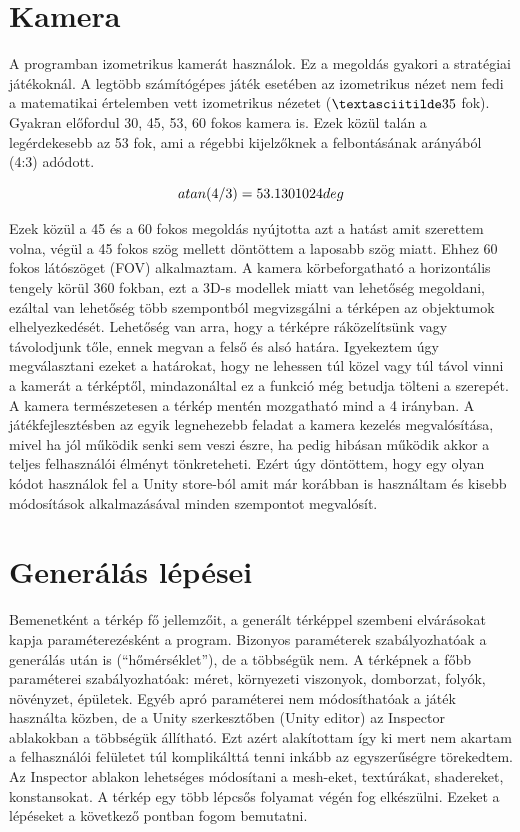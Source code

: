 \section{Kamera}

A programban izometrikus kamerát használok. Ez a megoldás gyakori a stratégiai játékoknál. A legtöbb számítógépes játék esetében az izometrikus nézet nem fedi a matematikai értelemben vett izometrikus nézetet ($\textasciitilde 35$ fok). Gyakran előfordul 30, 45, 53, 60 fokos kamera is. Ezek közül talán a legérdekesebb az 53 fok, ami a régebbi kijelzőknek a felbontásának arányából (4:3) adódott. 

$$
atan(4 / 3) = 53.1301024 \space deg
$$

\noindent Ezek közül a 45 és a 60 fokos megoldás nyújtotta azt a hatást amit szerettem volna, végül a 45 fokos szög mellett döntöttem a laposabb szög miatt. Ehhez 60 fokos látószöget (FOV) alkalmaztam. A kamera körbeforgatható a horizontális tengely körül 360 fokban, ezt a 3D-s modellek miatt van lehetőség megoldani, ezáltal van lehetőség több szempontból megvizsgálni a térképen az objektumok elhelyezkedését. Lehetőség van arra, hogy a térképre ráközelítsünk vagy távolodjunk tőle, ennek megvan a felső és alsó határa. Igyekeztem úgy megválasztani ezeket a határokat, hogy ne lehessen túl közel vagy túl távol vinni a kamerát a térképtől, mindazonáltal ez a funkció még betudja tölteni a szerepét. A kamera természetesen a térkép mentén mozgatható mind a 4 irányban. 
\newline
\newline A játékfejlesztésben az egyik legnehezebb feladat a kamera kezelés megvalósítása, mivel ha jól működik senki sem veszi észre, ha pedig hibásan működik akkor a teljes felhasználói élményt tönkreteheti. Ezért úgy döntöttem, hogy egy olyan kódot használok fel a Unity store-ból amit már korábban is használtam és kisebb módosítások alkalmazásával minden szempontot megvalósít.

\section{Generálás lépései}

Bemenetként a térkép fő jellemzőit, a generált térképpel szembeni elvárásokat kapja paraméterezésként a program. Bizonyos paraméterek szabályozhatóak a generálás után is (“hőmérséklet”), de a többségük nem. A térképnek a főbb paraméterei szabályozhatóak: méret, környezeti viszonyok, domborzat, folyók, növényzet, épületek. Egyéb apró paraméterei nem módosíthatóak a játék használta közben, de a Unity szerkesztőben (Unity editor) az Inspector ablakokban a többségük állítható. Ezt azért alakítottam így ki mert nem akartam a felhasználói felületet túl komplikálttá tenni inkább az egyszerűségre törekedtem. Az Inspector ablakon lehetséges módosítani a mesh-eket, textúrákat, shadereket, konstansokat.
\newline
\newline A térkép egy több lépcsős folyamat végén fog elkészülni. Ezeket a lépéseket a következő pontban fogom bemutatni.

